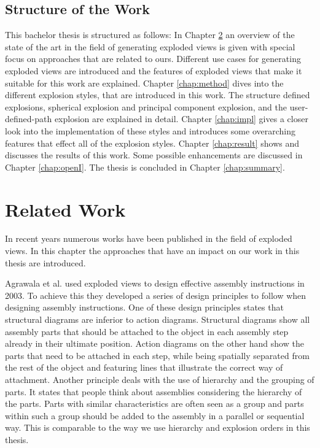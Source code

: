 \documentclass[draft,final]{vutinfth} %
\begin{document}
\section{Structure of the Work}
\label{sec:struct}
This bachelor thesis is structured as follows: In Chapter \ref{chap:relWork} an overview of the state of the art in the field of generating exploded views is given with special focus on approaches that are related to ours. Different use cases for generating exploded views are introduced and the features of exploded views that make it suitable for this work are explained. Chapter \ref{chap:method} dives into the different explosion styles, that are introduced in this work. The structure defined explosions, spherical explosion and principal component explosion, and the user-defined-path explosion are explained in detail. Chapter \ref{chap:impl} gives a closer look into the implementation of these styles and introduces some overarching features that effect all of the explosion styles. Chapter \ref{chap:result} shows and discusses the results of this work. Some possible enhancements are discussed in Chapter \ref{chap:openI}. The thesis is concluded in Chapter \ref{chap:summary}.

\chapter{Related Work}
\label{chap:relWork}

In recent years numerous works have been published in the field of exploded views. In this chapter the approaches that have an impact on our work in this thesis are introduced.

\par Agrawala et al. \cite{agrawala2003designing} used exploded views to design effective assembly instructions in 2003. To achieve this they developed a series of design principles to follow when designing assembly instructions. One of these design principles states that structural diagrams are inferior to action diagrams. Structural diagrams show all assembly parts that should be attached to the object in each assembly step already in their ultimate position. Action diagrams on the other hand show the parts that need to be attached in each step, while being spatially separated from the rest of the object and featuring lines that illustrate the correct way of attachment. Another principle deals with the use of hierarchy and the grouping of parts. It states that people think about assemblies considering the hierarchy of the parts. Parts with similar characteristics are often seen as a group and parts within such a group should be added to the assembly in a parallel or sequential way. This is comparable to the way we use hierarchy and explosion orders in this thesis.
\end{document}
